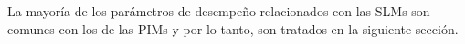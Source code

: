 La mayoría de los parámetros de desempeño relacionados con las \ac{SLM}s son comunes con los de las \acp{PIM} y por lo tanto, son tratados en la siguiente sección.







